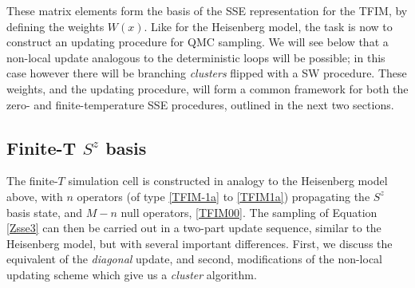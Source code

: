 \documentclass[vecphys]{svmult}
\begin{document}
These matrix elements form the basis of the SSE representation for the TFIM, by defining the weights $W(x)$.  Like for the Heisenberg model, the task is now to construct an updating procedure for QMC sampling.
We will see below that a non-local update analogous to the deterministic loops will be possible; in this case however there will be branching {\it clusters} flipped with a SW procedure.  These weights, and the updating procedure, will form a common framework for both the zero- and finite-temperature SSE procedures, outlined in the next two sections.

\subsection{Finite-T $S^z$ basis} \label{Melko:TFIMfiniteT}

The finite-$T$ simulation cell is constructed in analogy to the Heisenberg model above, with $n$ operators (of type \ref{TFIM-1a} to \ref{TFIM1a}) propagating the $S^z$ basis state, and $M-n$ null operators, \ref{TFIM00}.
The sampling of Equation \ref{Zsse3} can then be carried out in a two-part update sequence, similar to the Heisenberg model, but with several important differences.  First, we discuss the equivalent of the {\em diagonal} update, and second, modifications of the non-local updating scheme which give us a {\em cluster} algorithm.
\end{document}
